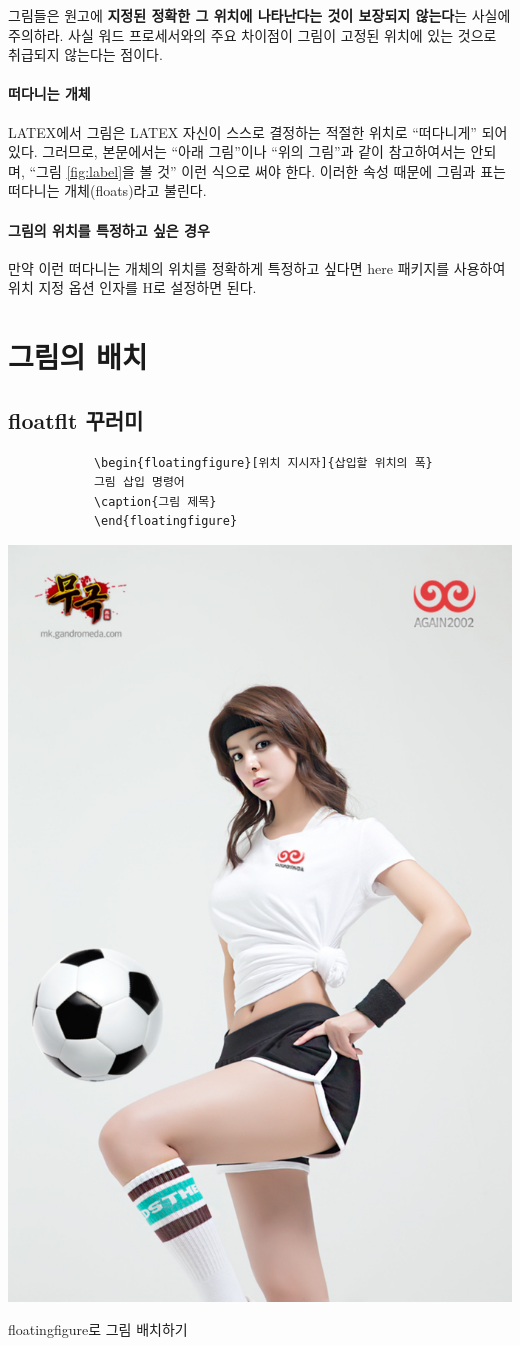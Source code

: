 		그림들은 원고에 \textbf{지정된 정확한 그 위치에 나타난다는 것이 보장되지 않는다}는 사실에 주의하라. 
		사실 워드 프로세서와의 주요 차이점이 그림이 고정된 위치에 있는 것으로 취급되지 않는다는 점이다. 
	
		\paragraph{떠다니는 개체} 
			LATEX에서 그림은 LATEX 자신이 스스로 결정하는 적절한 위치로 “떠다니게” 되어 있다. 그러므로,
		본문에서는 “아래 그림”이나 “위의 그림”과 같이 참고하여서는 안되며, “그림 \ref{fig:label}을
		볼 것” 이런 식으로 써야 한다.
		이러한 속성 때문에 그림과 표는 떠다니는 개체(floats)라고 불린다. 
		
		\paragraph{그림의 위치를 특정하고 싶은 경우} 
		만약 이런 떠다니는 개체의 위치를 정확하게 특정하고 싶다면 here 패키지를 사용하여 위치 지정 옵션 인자를 H로 설정하면 된다.
	
	
	\newpage
	\section{그림의 배치}
		
		\clearpage	
		\subsection{floatflt 꾸러미}
		
			\begin{verbatim}
			\begin{floatingfigure}[위치 지시자]{삽입할 위치의 폭}
			그림 삽입 명령어
			\caption{그림 제목}
			\end{floatingfigure}
			\end{verbatim}
		
			\begin{floatingfigure}[r]{0.33\textwidth}
			\includegraphics[width=.3\textwidth]{./fig/8.pdf}
			\caption{floatingfigure로 그림 배치하기}
			\end{floatingfigure}
			
